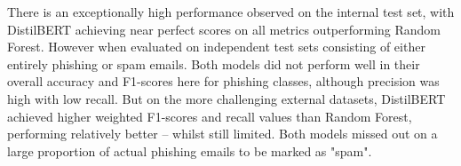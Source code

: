 \noindent There is an exceptionally high performance observed on the internal test set, with DistilBERT achieving near perfect scores on all metrics outperforming Random Forest. However when evaluated on independent test sets consisting of either entirely phishing or spam emails. Both models did not perform well in their overall accuracy and F1-scores here for phishing classes, although precision was high with low recall. But on the more challenging external datasets, DistilBERT achieved higher weighted F1-scores and recall values than Random Forest, performing relatively better -- whilst still limited. Both models missed out on a large proportion of actual phishing emails to be marked as "spam".
